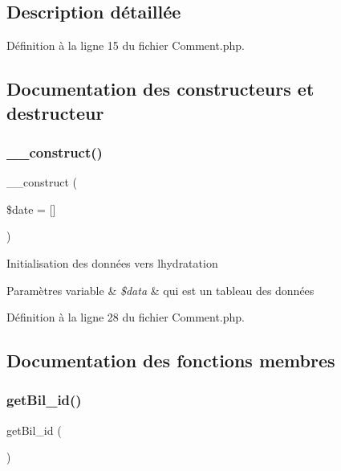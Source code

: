 \subsection{Description détaillée}


Définition à la ligne 15 du fichier Comment.\+php.



\subsection{Documentation des constructeurs et destructeur}
\mbox{\label{class_src_1_1_entity_1_1_comment_a594620c0e8c7693172eee4901c0b7705}} 
\subsubsection{\texorpdfstring{\+\_\+\+\_\+construct()}{\_\_construct()}}
{\footnotesize\ttfamily \+\_\+\+\_\+construct (\begin{DoxyParamCaption}\item[{}]{\$date = {\ttfamily \mbox{[}\mbox{]}} }\end{DoxyParamCaption})}

Initialisation des données vers l\textquotesingle{}hydratation 
\begin{DoxyParams}[1]{Paramètres}
variable & {\em \$data} & qui est un tableau des données \\
\hline
\end{DoxyParams}


Définition à la ligne 28 du fichier Comment.\+php.



\subsection{Documentation des fonctions membres}
\mbox{\label{class_src_1_1_entity_1_1_comment_a1df6ee009c81d0d807d36d18d40b9e97}} 
\subsubsection{\texorpdfstring{get\+Bil\+\_\+id()}{getBil\_id()}}
{\footnotesize\ttfamily get\+Bil\+\_\+id (\begin{DoxyParamCaption}{ }\end{DoxyParamCaption})}



